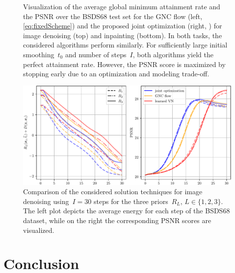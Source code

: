 \documentclass{article}
\theoremstyle{plain}
\theoremstyle{definition}
\theoremstyle{remark}
\begin{document}
\begin{figure}[h!]
\caption{
Visualization of the average global minimum attainment rate and the PSNR over the BSDS68 test set for the GNC flow (left, \eqref{eq:fixedScheme}) and the proposed joint optimization (right, ) for image denoising (top) and inpainting (bottom).
In both tasks, the considered algorithms perform similarly.
For sufficiently large initial smoothing~$t_0$ and number of steps~$I$, both algorithms yield the perfect attainment rate.
However, the PSNR score is maximized by stopping early due to an optimization and modeling trade-off.
}
\label{fig:algComparison}
\end{figure}

\begin{figure}
\centering
\includegraphics[width=.9\linewidth]{figures/results/plots_denoise}
\caption{
Comparison of the considered solution techniques for image denoising using~$I=30$ steps for the three priors~$R_L$, $L\in\{1,2,3\}$.
The left plot depicts the average energy for each step of the BSDS68 dataset, while on the right the corresponding PSNR scores are visualized.
}
\label{fig:allThreeComparison}
\end{figure}

\section{Conclusion}






\newpage
\appendix
\onecolumn
\end{document}
